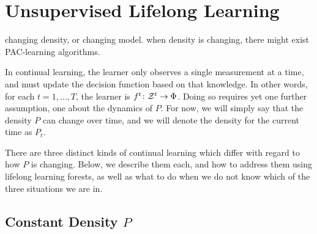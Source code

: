\documentclass{article}
\begin{document}







\clearpage 
\section{Unsupervised Lifelong Learning}
\label{sec:continual}



changing density, or changing model.
when density is changing, there might exist PAC-learning algorithms.



In continual learning, the learner only observes a single measurement at a time, and must update the decision function based on that knowledge.  In other words, for each $t = 1,\ldots, T$, the learner is $f^t {\colon} \mathcal{Z}^t \to \Phi$.  
Doing so requires yet one further assumption, one about the dynamics of $P$.  For now, we will simply say that the density $P$ can change over time, and we will denote the density for the current time as $P_t$.  


There are three distinct kinds of continual learning which differ with regard to how $P$ is changing. Below, we describe them each, and how to address them using lifelong learning forests, as well as what to do when we do not know which of the three situations we are in. 

\subsection{Constant Density $P$}
\label{sec:constant}
\end{document}
